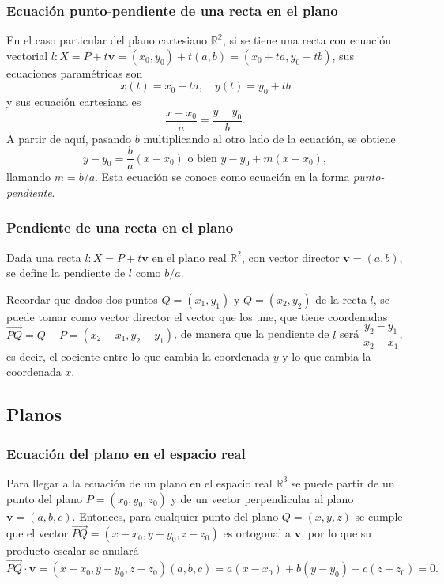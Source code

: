 \begin{frame}
	\frametitle{Ecuación punto-pendiente de una recta en el plano}
	En el caso particular del plano cartesiano $\mathbb{R^2}$, si se tiene una recta con ecuación vectorial $l: X=P+t\mathbf{v}=(x_0,y_0)+t(a,b)
	= (x_0+ta,y_0+tb)$, sus ecuaciones paramétricas son
	\[
		x(t)=x_0+ta,\quad y(t)=y_0+tb
	\]
	y sus ecuación cartesiana es
	\[
		\frac{x-x_0}{a} = \frac{y-y_0}{b}.
	\]  
	A partir de aquí, pasando $b$ multiplicando al otro lado de la ecuación, se obtiene 
	\[
		y-y_0 = \frac{b}{a}(x-x_0) \mbox{ o bien } y-y_0+m(x-x_0),
	\]
	llamando $m=b/a$. Esta ecuación se conoce como ecuación en la forma \emph{punto-pendiente}.
	 
\end{frame} 


\begin{frame}
	\frametitle{Pendiente de una recta en el plano}
	\begin{definicion}
		Dada una recta $l: X=P+t\mathbf{v}$ en el plano real $\mathbb{R}^2$, con vector director $\mathbf{v}=(a,b)$, se define la pendiente de $l$ como $b/a$.
	\end{definicion}
	
	Recordar que dados dos puntos $Q=(x_1,y_1)$ y $Q=(x_2,y_2)$ de la recta $l$, se puede tomar como vector director el vector que los une, que tiene coordenadas $\vec{PQ}=Q-P=(x_2-x_1,y_2-y_1)$, de manera que la pendiente de $l$ será 
	$\dfrac{y_2-y_1}{x_2-x_1}$, es decir, el cociente entre lo que cambia la coordenada $y$ y lo que cambia la coordenada $x$.
	
	\begin{center}
		\scalebox{0.7}{}
	\end{center}
\end{frame} 



\subsection{Planos}
\begin{frame}
	\frametitle{Ecuación del plano en el espacio real}
	Para llegar a la ecuación de un plano en el espacio real $\mathbb{R}^3$ se puede partir de un punto del plano $P=(x_0,y_0,z_0)$ y de un vector perpendicular al plano $\mathbf{v}=(a,b,c)$. 
	Entonces, para cualquier punto del plano $Q=(x,y,z)$ se cumple que el vector $\vec{PQ} = (x-x_0,y-y_0,z-z_0)$ es ortogonal a $\mathbf{v}$, por lo que su producto escalar se anulará
	\[
		\vec{PQ}\cdot\mathbf{v} = (x-x_0,y-y_0,z-z_0)(a,b,c) = a(x-x_0)+b(y-y_0)+c(z-z_0) = 0.
	\]
	
	\begin{center}
		\scalebox{0.8}{}
	\end{center}
\end{frame} 



